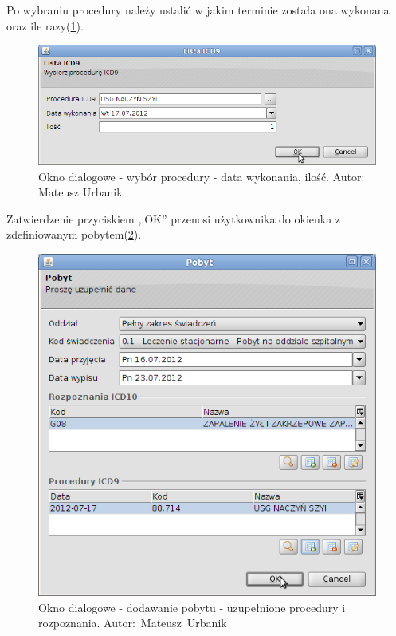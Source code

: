 Po wybraniu procedury należy ustalić w jakim terminie została ona wykonana oraz ile razy(\ref{img:gruper6}).

\begin{figure}%
\centering
\includegraphics[scale=0.4]{images/gruper6}
\caption[Widok grupera]{Okno dialogowe - wybór procedury - data wykonania, ilość. Autor: Mateusz Urbanik}
\label{img:gruper6}
\end{figure}

Zatwierdzenie przyciskiem ,,OK'' przenosi użytkownika do okienka z zdefiniowanym pobytem(\ref{img:gruper7}).

\begin{figure}%
\centering
\includegraphics[scale=0.4]{images/gruper7}
\caption[Widok grupera]{Okno dialogowe - dodawanie pobytu - uzupełnione procedury i rozpoznania. \mbox{Autor: Mateusz Urbanik}}
\label{img:gruper7}
\end{figure}

